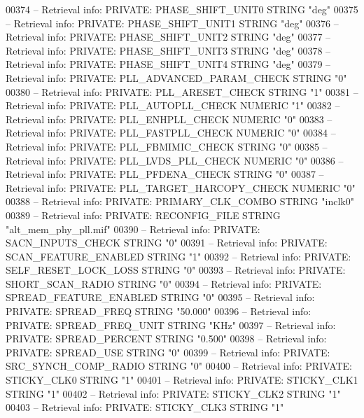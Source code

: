 \begin{DoxyCode}
{00374 \textcolor{keyword}{-- Retrieval info: PRIVATE: PHASE\_SHIFT\_UNIT0 STRING "deg"}
00375 \textcolor{keyword}{-- Retrieval info: PRIVATE: PHASE\_SHIFT\_UNIT1 STRING "deg"}
00376 \textcolor{keyword}{-- Retrieval info: PRIVATE: PHASE\_SHIFT\_UNIT2 STRING "deg"}
00377 \textcolor{keyword}{-- Retrieval info: PRIVATE: PHASE\_SHIFT\_UNIT3 STRING "deg"}
00378 \textcolor{keyword}{-- Retrieval info: PRIVATE: PHASE\_SHIFT\_UNIT4 STRING "deg"}
00379 \textcolor{keyword}{-- Retrieval info: PRIVATE: PLL\_ADVANCED\_PARAM\_CHECK STRING "0"}
00380 \textcolor{keyword}{-- Retrieval info: PRIVATE: PLL\_ARESET\_CHECK STRING "1"}
00381 \textcolor{keyword}{-- Retrieval info: PRIVATE: PLL\_AUTOPLL\_CHECK NUMERIC "1"}
00382 \textcolor{keyword}{-- Retrieval info: PRIVATE: PLL\_ENHPLL\_CHECK NUMERIC "0"}
00383 \textcolor{keyword}{-- Retrieval info: PRIVATE: PLL\_FASTPLL\_CHECK NUMERIC "0"}
00384 \textcolor{keyword}{-- Retrieval info: PRIVATE: PLL\_FBMIMIC\_CHECK STRING "0"}
00385 \textcolor{keyword}{-- Retrieval info: PRIVATE: PLL\_LVDS\_PLL\_CHECK NUMERIC "0"}
00386 \textcolor{keyword}{-- Retrieval info: PRIVATE: PLL\_PFDENA\_CHECK STRING "0"}
00387 \textcolor{keyword}{-- Retrieval info: PRIVATE: PLL\_TARGET\_HARCOPY\_CHECK NUMERIC "0"}
00388 \textcolor{keyword}{-- Retrieval info: PRIVATE: PRIMARY\_CLK\_COMBO STRING "inclk0"}
00389 \textcolor{keyword}{-- Retrieval info: PRIVATE: RECONFIG\_FILE STRING "alt\_mem\_phy\_pll.mif"}
00390 \textcolor{keyword}{-- Retrieval info: PRIVATE: SACN\_INPUTS\_CHECK STRING "0"}
00391 \textcolor{keyword}{-- Retrieval info: PRIVATE: SCAN\_FEATURE\_ENABLED STRING "1"}
00392 \textcolor{keyword}{-- Retrieval info: PRIVATE: SELF\_RESET\_LOCK\_LOSS STRING "0"}
00393 \textcolor{keyword}{-- Retrieval info: PRIVATE: SHORT\_SCAN\_RADIO STRING "0"}
00394 \textcolor{keyword}{-- Retrieval info: PRIVATE: SPREAD\_FEATURE\_ENABLED STRING "0"}
00395 \textcolor{keyword}{-- Retrieval info: PRIVATE: SPREAD\_FREQ STRING "50.000"}
00396 \textcolor{keyword}{-- Retrieval info: PRIVATE: SPREAD\_FREQ\_UNIT STRING "KHz"}
00397 \textcolor{keyword}{-- Retrieval info: PRIVATE: SPREAD\_PERCENT STRING "0.500"}
00398 \textcolor{keyword}{-- Retrieval info: PRIVATE: SPREAD\_USE STRING "0"}
00399 \textcolor{keyword}{-- Retrieval info: PRIVATE: SRC\_SYNCH\_COMP\_RADIO STRING "0"}
00400 \textcolor{keyword}{-- Retrieval info: PRIVATE: STICKY\_CLK0 STRING "1"}
00401 \textcolor{keyword}{-- Retrieval info: PRIVATE: STICKY\_CLK1 STRING "1"}
00402 \textcolor{keyword}{-- Retrieval info: PRIVATE: STICKY\_CLK2 STRING "1"}
00403 \textcolor{keyword}{-- Retrieval info: PRIVATE: STICKY\_CLK3 STRING "1"}
}
\end{DoxyCode}
